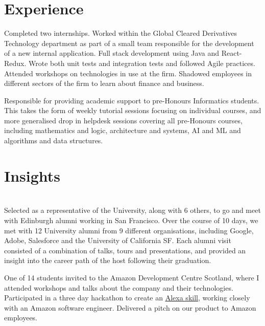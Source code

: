 \documentclass[]{deedy-resume-openfont}
\begin{document}
\begin{minipage}[t]{0.66\textwidth} 


\section{Experience}
Completed two internships. Worked within the Global Cleared Derivatives Technology department as part of a small team responsible for the development of a new internal application. Full stack development using Java and React-Redux. Wrote both unit tests and integration tests and followed Agile practices. Attended workshops on technologies in use at the firm. Shadowed employees in different sectors of the firm to learn about finance and business.
\sectionsep
\sectionsep

Responsible for providing academic support to pre-Honours Informatics students. This takes the form of weekly tutorial sessions focusing on individual courses, and more generalised drop in helpdesk sessions covering all pre-Honours courses, including mathematics and logic, architecture and systems, AI and ML and algorithms and data structures.
\sectionsep


\section{Insights}
 \\
Selected as a representative of the University, along with 6 others, to go and meet with Edinburgh alumni working in San Francisco. Over the course of 10 days, we met with 12 University alumni from 9 different organisations, including Google, Adobe, Salesforce and the University of California SF. Each alumni visit consisted of a combination of talks, tours and presentations, and provided an insight into the career path of the host following their graduation.
\sectionsep
\sectionsep

One of 14 students invited to the Amazon Development Centre Scotland, where I attended workshops and talks about the company and their technologies. Participated in a three day hackathon to create an \href{https://github.com/kimbethstonehouse/asking-for-travel}{\underline{Alexa skill}}, working closely with an Amazon software engineer. Delivered a pitch on our product to Amazon employees.
\sectionsep
\sectionsep


\end{minipage}
\end{document}
